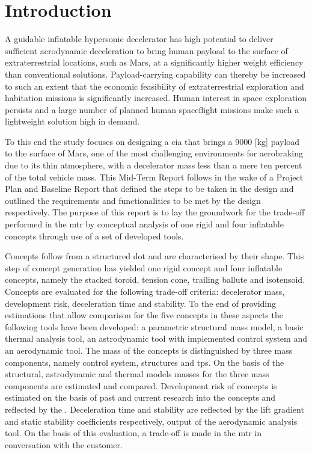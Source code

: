 \section{Introduction}
\label{cha:introduction}
A guidable inflatable hypersonic decelerator has high potential to deliver sufficient aerodynamic deceleration to bring human payload to the surface of extraterrestrial locations, such as Mars, at a significantly higher weight efficiency than conventional solutions. Payload-carrying capability can thereby be increased to such an extent that the economic feasibility of extraterrestrial exploration and habitation missions is significantly increased. Human interest in space exploration persists and a large number of planned human spaceflight missions make such a lightweight solution high in demand. 

To this end the study focuses on designing a \acrfull{cia} that brings a 9000 [kg] payload to the surface of Mars, one of the most challenging environments for aerobraking due to its thin atmosphere, with a decelerator mass less than a mere ten percent of the total vehicle mass. This Mid-Term Report follows in the wake of a Project Plan and Baseline Report that defined the steps to be taken in the design and outlined the requirements and functionalities to be met by the design respectively. The purpose of this report is to lay the groundwork for the trade-off performed in the \acrfull{mtr} by conceptual analysis of one rigid and four inflatable concepts through use of a set of developed tools.

Concepts follow from a structured \acrfull{dot} and are characterised by their shape. This step of concept generation has yielded one rigid concept and four inflatable concepts, namely the stacked toroid, tension cone, trailing ballute and isotensoid. Concepts are evaluated for the following trade-off criteria: decelerator mass, development risk, deceleration time and stability. To the end of providing estimations that allow comparison for the five concepts in these aspects the following tools have been developed: a parametric structural mass model, a basic thermal analysis tool, an astrodynamic tool with implemented control system and an aerodynamic tool. The mass of the concepts is distinguished by three mass components, namely control system, structures and \acrfull{tps}. On the basis of the structural, astrodynamic and thermal models masses for the three mass components are estimated and compared. Development risk of concepts is estimated on the basis of past and current research into the concepts and reflected by the . Deceleration time and stability are reflected by the lift gradient and static stability coefficients respectively, output of the aerodynamic analysis tool. On the basis of this evaluation, a trade-off is made in the \gls{mtr} in conversation with the customer.

